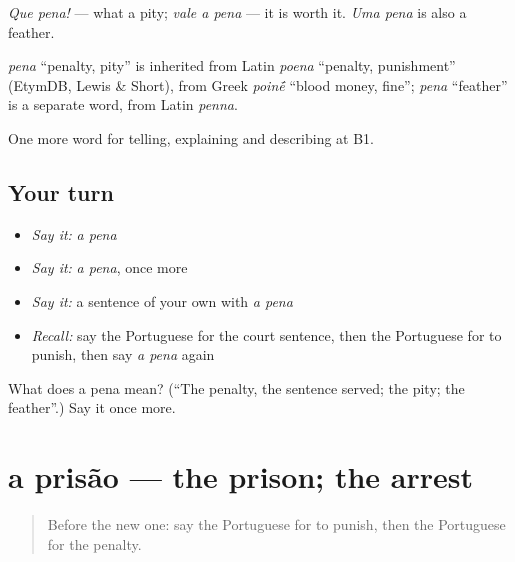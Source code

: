 \emph{Que pena!} — what a pity; \emph{vale a pena} — it is worth it. \emph{Uma pena} is also a feather.

\begin{cousinweb}
\emph{pena} \textquotedblleft{}penalty, pity\textquotedblright{} is inherited from Latin \emph{poena} \textquotedblleft{}penalty, punishment\textquotedblright{} (EtymDB, Lewis \& Short), from Greek \emph{poin\'{\={e}}} \textquotedblleft{}blood money, fine\textquotedblright{}; \emph{pena} \textquotedblleft{}feather\textquotedblright{} is a separate word, from Latin \emph{penna}.
\end{cousinweb}

\begin{grammarlens}[title={What you've built}]
One more word for telling, explaining and describing at B1.
\end{grammarlens}

\subsection*{Your turn}
\begin{itemize}
\raggedright
  \item \emph{Say it:} \emph{a pena}
  \item \emph{Say it:} \emph{a pena}, once more
  \item \emph{Say it:} a sentence of your own with \emph{a pena}
  \item \emph{Recall:} say the Portuguese for the court sentence, then the Portuguese for to punish, then say \emph{a pena} again
\end{itemize}

\begin{tcolorbox}[breakable,colback=teal!4,colframe=teal!35!black,title={Before you move on}]
What does a pena mean? (\textquotedblleft{}The penalty, the sentence served; the pity; the feather\textquotedblright{}.) Say it once more.
\end{tcolorbox}
\section[a prisão]{a prisão — the prison; the arrest}

\label{lesson:PT-C388-prisao}



\begin{quote}
Before the new one: say the Portuguese for to punish, then the Portuguese for the penalty.
\end{quote}

